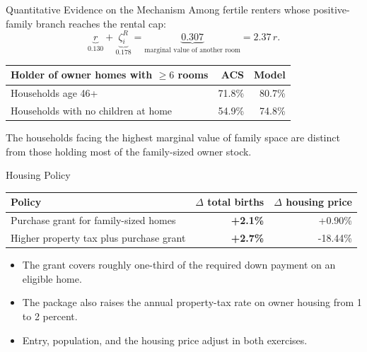 \documentclass[aspectratio=169,11pt]{beamer}
\newcommand{\source}[1]{}
\newcommand{\tightitems}{\setlength{\itemsep}{0.55em}}
\newcommand{\1}{\mathbf 1}
\begin{document}
\begin{frame}{Quantitative Evidence on the Mechanism}
  Among fertile renters whose positive-family branch reaches the rental cap:
  \[
    \underbrace{r}_{0.130}
      +
    \underbrace{\zeta_i^R}_{0.178}
      =
    \underbrace{0.307}_{\text{marginal value of another room}}
      =2.37\,r.
  \]

  \begin{center}
  \small
  \begin{tabular}{@{}lrr@{}}
    \toprule
    Holder of owner homes with $\ge6$ rooms & ACS & Model \\
    \midrule
    Households age 46+ & 71.8\% & 80.7\% \\
    Households with no children at home & 54.9\% & 74.8\% \\
    \bottomrule
  \end{tabular}
  \end{center}

  The households facing the highest marginal value of family space are distinct from those holding most of the family-sized owner stock.
  \source{Circulated note, Quantitative Evidence on the Mechanism.}
\end{frame}

\begin{frame}{Housing Policy}
  \begin{center}
  \renewcommand{\arraystretch}{1.25}
  \begin{tabularx}{0.90\textwidth}{@{}Yrr@{}}
    \toprule
    Policy & $\Delta$ total births & $\Delta$ housing price \\
    \midrule
    Purchase grant for family-sized homes & \textbf{+2.1\%} & +0.90\% \\
    Higher property tax plus purchase grant & \textbf{+2.7\%} & -18.44\% \\
    \bottomrule
  \end{tabularx}
  \end{center}

  \vspace{0.8em}
  \begin{itemize}\tightitems
    \item The grant covers roughly one-third of the required down payment on an eligible home.
    \item The package also raises the annual property-tax rate on owner housing from 1 to 2 percent.
    \item Entry, population, and the housing price adjust in both exercises.
  \end{itemize}
  \source{Circulated note, Housing Policy, Table 5.}
\end{frame}
\end{document}
